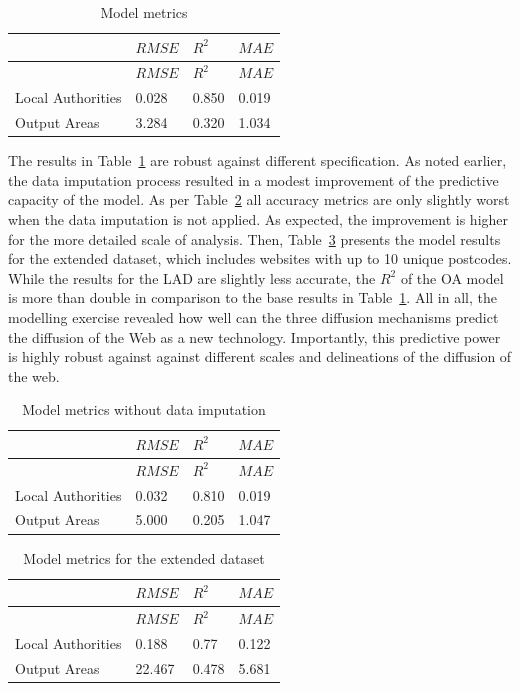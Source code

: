 \documentclass[
  authoryear,
  preprint,
  3p]{elsarticle}
\begin{document}
\begin{longtable}[]{@{}llll@{}}
\caption{Model metrics}\label{tbl-model-metrics}\tabularnewline
\toprule\noalign{}
& \(RMSE\) & \(R^{2}\) & \(MAE\) \\
\midrule\noalign{}
\endfirsthead
\toprule\noalign{}
& \(RMSE\) & \(R^{2}\) & \(MAE\) \\
\midrule\noalign{}
\endhead
\bottomrule\noalign{}
\endlastfoot
Local Authorities & 0.028 & 0.850 & 0.019 \\
Output Areas & 3.284 & 0.320 & 1.034 \\
\end{longtable}

The results in Table~\ref{tbl-model-metrics} are robust against
different specification. As noted earlier, the data imputation process
resulted in a modest improvement of the predictive capacity of the
model. As per Table~\ref{tbl-model-metrics-no-correction} all accuracy
metrics are only slightly worst when the data imputation is not applied.
As expected, the improvement is higher for the more detailed scale of
analysis. Then, Table~\ref{tbl-model-metrics-10} presents the model
results for the extended dataset, which includes websites with up to 10
unique postcodes. While the results for the LAD are slightly less
accurate, the \(R^{2}\) of the OA model is more than double in
comparison to the base results in Table~\ref{tbl-model-metrics}. All in
all, the modelling exercise revealed how well can the three diffusion
mechanisms predict the diffusion of the Web as a new technology.
Importantly, this predictive power is highly robust against against
different scales and delineations of the diffusion of the web.

\begin{longtable}[]{@{}llll@{}}
\caption{Model metrics without data imputation
}\label{tbl-model-metrics-no-correction}\tabularnewline
\toprule\noalign{}
& \(RMSE\) & \(R^{2}\) & \(MAE\) \\
\midrule\noalign{}
\endfirsthead
\toprule\noalign{}
& \(RMSE\) & \(R^{2}\) & \(MAE\) \\
\midrule\noalign{}
\endhead
\bottomrule\noalign{}
\endlastfoot
Local Authorities & 0.032 & 0.810 & 0.019 \\
Output Areas & 5.000 & 0.205 & 1.047 \\
\end{longtable}

\begin{longtable}[]{@{}llll@{}}
\caption{Model metrics for the extended
dataset}\label{tbl-model-metrics-10}\tabularnewline
\toprule\noalign{}
& \(RMSE\) & \(R^{2}\) & \(MAE\) \\
\midrule\noalign{}
\endfirsthead
\toprule\noalign{}
& \(RMSE\) & \(R^{2}\) & \(MAE\) \\
\midrule\noalign{}
\endhead
\bottomrule\noalign{}
\endlastfoot
Local Authorities & 0.188 & 0.77 & 0.122 \\
Output Areas & 22.467 & 0.478 & 5.681 \\
\end{longtable}
\end{document}
